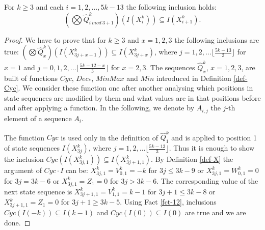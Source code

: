 \documentclass{llncs}
\begin{document}
\begin{lemma}\label{l7}
For $k\ge 3$ and each $i=1,2,\ldots,5k-13$ the following inclusion holds:
\[ (\bigotimes \hat{Q}^k_{i~mod~3 +1})(I(X^k_i))\subseteq I(X^k_{i+1}). \]
\end{lemma}
\begin{proof}
We have to prove that for $k\ge 3$ and $x = 1,2,3$ the following inclusions 
are true: $(\bigotimes \hat{Q}^k_x)(I(X^k_{3j+x-1}))\subseteq 
I(X^k_{3j+x})$, where $j=1,2,\ldots\lfloor\frac{5k-13}{3}\rfloor$ for $x=1$ 
and  $j=0,1,2,\ldots\lfloor\frac{5k-12-x}{3}\rfloor$ for $x=2,3$. The 
sequences $\hat{Q}^k_x$, $x=1,2,3$, are built of functions $Cyc$, 
$Dec_*$, $MinMax$ and $Min$ introduced in Definition \ref{def-Cyc}. We 
consider these function one after another analysing which positions in state
sequences are modified by them and what values are in that positions before 
and after applying a function. In the following, we denote by $A_{i,j}$ the $j$-th 
element of a sequence $A_i$.

The function $Cyc$ is used only in the definition of $\hat{Q}^k_1$ and is
applied to position 1 of state sequences $I(X^k_{3j})$, where
$j=1,2,\ldots\lfloor\frac{5k-13}{3}\rfloor$. Thus it is enough to show the
inclusion $Cyc(I(X^k_{3j,1}))\subseteq I(X^k_{3j+1,1})$. By Definition
\ref{def-X} the argument of $Cyc\cdot I$ can be: $X^k_{3j,1} = V^k_{0,1} = -k$
for $3j\le 3k-9$ or $X^k_{3j,1} = W^k_{0,1} = 0$ for $3j=3k-6$ or $X^k_{3j,1}
= Z_1 = 0$ for $3j>3k-6$. The corresponding value of the next state sequence
is $X^k_{3j+1,1} = V^k_{1,1} = k-1$ for $3j+1\le 3k-8$ or $X^k_{3j+1,1} = Z_1
= 0$ for $3j+1\ge 3k-5$. Using Fact \ref{fct-12}, inclusions $Cyc(I(-k))
\subseteq I(k-1)$ and $Cyc(I(0)) \subseteq I(0)$ are true and we are done.


\end{proof}
\end{document}
